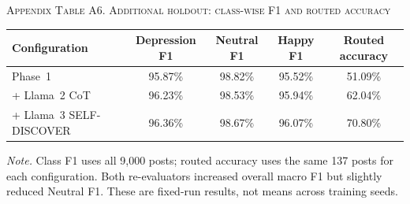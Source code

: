 \documentclass{ieeeaccess}
\begin{document}
\par\medskip
{}
\noindent\textsc{Appendix Table A6. Additional holdout: class-wise F1 and routed accuracy}\par
\smallskip
\small
\setlength{\tabcolsep}{5pt}
\renewcommand{\arraystretch}{1.16}
\noindent\begin{tabularx}{\textwidth}{@{}Y c c c c@{}}
\toprule
Configuration & Depression F1 & Neutral F1 & Happy F1 & Routed accuracy \\
\midrule
Phase~1 & 95.87\% & 98.82\% & 95.52\% & 51.09\% \\
+ Llama~2 CoT & 96.23\% & 98.53\% & 95.94\% & 62.04\% \\
+ Llama~3 SELF-DISCOVER & 96.36\% & 98.67\% & 96.07\% & 70.80\% \\
\bottomrule
\end{tabularx}
\par\smallskip
\noindent\footnotesize\textit{Note.} Class F1 uses all 9,000 posts; routed accuracy uses the same 137 posts for each configuration. Both re-evaluators increased overall macro F1 but slightly reduced Neutral F1. These are fixed-run results, not means across training seeds.\normalsize

\EOD
\end{document}
